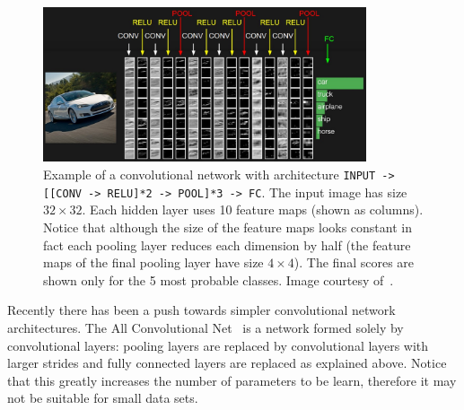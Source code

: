\begin{figure}[h]
	\centering
	\includegraphics[width = 0.85\textwidth]{plots/convNetExample.jpeg}
	\caption[Example of a convolutional network in action]{Example of a convolutional network with architecture \texttt{INPUT -> [[CONV -> RELU]*2 -> POOL]*3 -> FC}. The input image has size $32\times 32$. Each hidden layer uses 10 feature maps (shown as columns). Notice that although the size of the feature maps looks constant in fact each pooling layer reduces each dimension by half (the feature maps of the final pooling layer have size $4\times 4$). The final scores are shown only for the 5 most probable classes. Image courtesy of~\cite{Karpathy2015}.}
	\label{fig:ConvNetExample}
\end{figure}

Recently there has been a push towards simpler convolutional network architectures. The All Convolutional Net~\cite{Springenberg2014} is a network formed solely by convolutional layers: pooling layers are replaced by convolutional layers with larger strides and fully connected layers are replaced as explained above. Notice that this greatly increases the number of parameters to be learn, therefore it may not be suitable for small data sets.

